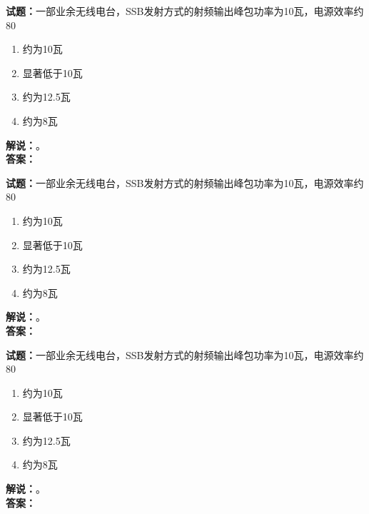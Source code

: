 \documentclass{ctexbook}
\begin{document}
\bigskip


\noindent\textbf{试题：}一部业余无线电台，SSB发射方式的射频输出峰包功率为10瓦，电源效率约80%
\begin{enumerate}[leftmargin=3em]
  \item 约为10瓦
  \item 显著低于10瓦
  \item 约为12.5瓦
  \item 约为8瓦
\end{enumerate}
\noindent\textbf{解说：}\textbf{}。\\\noindent\textbf{答案：}

\bigskip

\noindent\textbf{试题：}一部业余无线电台，SSB发射方式的射频输出峰包功率为10瓦，电源效率约80%
\begin{enumerate}[leftmargin=3em]
  \item 约为10瓦
  \item 显著低于10瓦
  \item 约为12.5瓦
  \item 约为8瓦
\end{enumerate}
\noindent\textbf{解说：}\textbf{}。\\\noindent\textbf{答案：}

\bigskip

\noindent\textbf{试题：}一部业余无线电台，SSB发射方式的射频输出峰包功率为10瓦，电源效率约80%
\begin{enumerate}[leftmargin=3em]
  \item 约为10瓦
  \item 显著低于10瓦
  \item 约为12.5瓦
  \item 约为8瓦
\end{enumerate}
\noindent\textbf{解说：}\textbf{}。\\\noindent\textbf{答案：}
\end{document}
